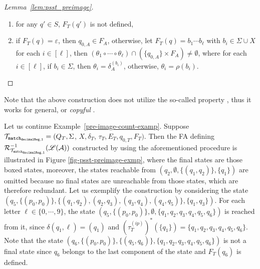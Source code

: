 \begin{proof}[Lemma~\ref{lem:psst_preimage}]
\begin{itemize}
\begin{enumerate}
%
  \item for any $q' \in S$, $F_T (q')$ is not defined,
  \item if $F_T(q) = \varepsilon$, then $q_{0, A}  \in F_A$, otherwise, 
let $F_T(q) = b_1 \cdots b_\ell$ with $b_i \in \Sigma \cup X$ for each $i \in [\ell]$, then $(\theta_1 \circ \cdots \circ \theta_\ell) \cap (\{q_{0,A}\} \times F_A) \neq \emptyset$, where for each $i \in [\ell]$, if $b_i \in \Sigma$, then $\theta_i = \delta^{(b_i)}_A$, otherwise, $\theta_i = \rho(b_i)$.
\end{enumerate}
\end{itemize}
\end{proof}

Note that the above construction  does not utilize the so-called  property \cite{AC10,AD11},
  thus it works for general, or \textit{copyful} \PSST{} \cite{FR17}.

\begin{example}
Let us continue Example~\ref{pre-image-count-examp}. Suppose $\mathcal{T}_{\tt match_{decimalReg,1}} = (Q_T, \Sigma$, $X, \delta_T$, $\tau_T, E_T,  q_{0, T}, F_T)$. Then the FA defining $\mathcal{R}^{-1}_{\mathcal{T}_{\tt match_{decimalReg,1}}}(\mathscr{L}(\mathcal{A}))$ constructed by using the aforementioned procedure is illustrated in Figure \ref{fig-psst-preimage-exmp}, where the final states are those boxed states, moreover, the states reachable from $(q_2, \emptyset, \{(q_1,q_2)\}, \{q_1\})$ are omitted because no final states are unreachable from those states, which are therefore redundant. Let us exemplify the construction by considering the state $(q_5, \{(p_0,p_0)\}, \{(q_1,q_2), (q_2,q_3), (q_3,q_4), (q_4, q_5)\}, \{q_1,q_3\})$. For each letter $\ell \in \{0,\cdots, 9\}$, the state $(q_5, \{(p_0,p_0)\}, \emptyset, \{q_1,q_2, q_3, q_4, q_5, q_6\})$ is reached from it, since $\delta(q_1,\ell) = (q_1)$ and $(\tau^{(ip)}_T)^*(\{q_1\}) = \{q_1, q_2, q_3, q_4, q_5, q_6\}$. Note that the state $(q_6, \{(p_0,p_0)\}, \{(q_5,q_6)\}, \{q_1, q_2, q_3, q_4, q_5, q_6\})$ is not a final state since $q_6$ belongs to the last component of the state and $F_T(q_6)$ is defined.
\end{example}



